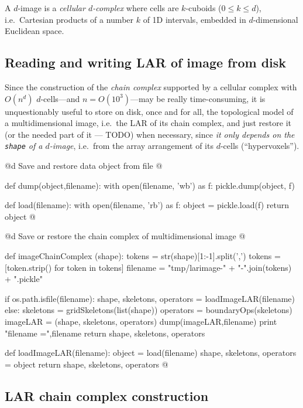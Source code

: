 \documentclass[11pt,oneside]{article}	%
\begin{document}
A $d$-image is a \emph{cellular $d$-complex} where cells are $k$-cuboids ($0\leq k\leq d$), i.e.~Cartesian products of a number $k$ of 1D intervals, embedded in $d$-dimensional Euclidean space. 


\subsection{Reading and writing LAR of image from disk}
Since the construction of the \emph{chain complex} supported by a cellular complex with $O(n^d)$ $d$-cells---and $n=O(10^3)$---may be really time-consuming, it is unquestionably useful to store on disk, once and for all, the topological model of a multidimensional image, i.e.~the LAR of its chain complex,  and just restore it (or the needed part of it --- TODO) when necessary, since \emph{it only depends on the \texttt{shape} of a $d$-image}, i.e.~from the array arrangement of its $d$-cells (``hypervoxels'').

@d Save and restore data object from file
@{def dump(object,filename):
	with open(filename, 'wb') as f:
	    pickle.dump(object, f)
	    
def load(filename):
	with open(filename, 'rb') as f:
	    object = pickle.load(f)
	return object
@}


@d Save or restore the chain complex of multidimensional image
@{def imageChainComplex (shape):
	tokens = str(shape)[1:-1].split(',')
	tokens = [token.strip() for token in tokens]
	filename = "tmp/larimage-" + "-".join(tokens) + ".pickle"
	
	if os.path.isfile(filename):
		shape, skeletons, operators = loadImageLAR(filename)
	else:
		skeletons = gridSkeletons(list(shape))
		operators = boundaryOps(skeletons)
		imageLAR = (shape, skeletons, operators)
		dump(imageLAR,filename)
		print "filename =",filename
	return shape, skeletons, operators
	
def loadImageLAR(filename):
	object = load(filename)
	shape, skeletons, operators = object
	return shape, skeletons, operators
@}
	



\subsection{LAR chain complex construction}
\end{document}
